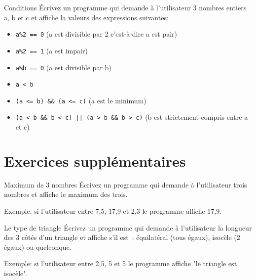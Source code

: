 \documentclass[a4paper,11pt]{style-esi/td}
\begin{document}
\newpage 

\begin{Exercice}{Conditions}
	\'Ecrivez un programme qui demande à l'utilisateur
	3 nombres entiers a, b et c et affiche la valeurs des expressions suivantes:
	\begin{itemize}
		\item \texttt{a\%2 == 0}  (a est divisible par 2 c'est-à-dire a est pair)
		\item \texttt{a\%2 == 1}  (a est impair)
		\item \texttt{a\%b == 0}  (a est divisible par b)
		\item \texttt{a < b}
		\item \texttt{(a <= b) \&\& (a <= c)} (a est le minimum)
		\item \texttt{(a < b \&\& b < c) || (a > b \&\& b > c)} (b est strictement compris entre a et c)
	\end{itemize}
\end{Exercice}




\section{Exercices supplémentaires}


\begin{Exercice}{Maximum de 3 nombres}
	\'Ecrivez un programme qui demande à l'utilisateur
	trois nombres  et affiche le maximum des trois.

	Exemple: si l'utilisateur entre 7,5, 17,9 et 2,3 le programme affiche 17,9.
\end{Exercice}

\begin{Exercice}{Le type de triangle}
	\'Ecrivez un programme qui demande à l'utilisateur
	la longueur des 3 côtés d'un triangle et affiche s'il est~:
	équilatéral (tous égaux), isocèle (2 égaux) ou quelconque.

	Exemple: si l'utilisateur entre 2,5, 5 et 5 le programme affiche "le triangle est isocèle".
\end{Exercice}
\end{document}
